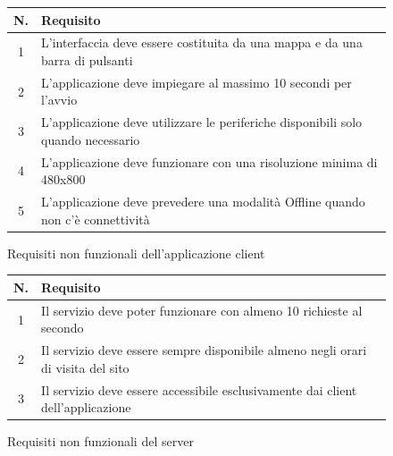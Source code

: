 \begin{figure}[h!]
\begin{center}
\begin{tabular}[c]{|c|p{9cm}|}
\hline
N. & Requisito\\ \hline
1 & L'interfaccia deve essere costituita da una mappa e da una barra di pulsanti\\ \hline
2 & L'applicazione deve impiegare al massimo 10 secondi per l'avvio\\ \hline
3 & L'applicazione deve utilizzare le periferiche disponibili solo quando necessario\\ \hline
4 & L'applicazione deve funzionare con una risoluzione minima di 480x800\\ \hline
5 & L'applicazione deve prevedere una modalità Offline quando non c'è connettività\\ \hline
\end{tabular}
\caption{Requisiti non funzionali dell'applicazione client\label{nfrclient}}
\end{center}
\end{figure}
\begin{figure}[h!]
\begin{center}
\begin{tabular}[c]{|c|p{9cm}|}
\hline
N. & Requisito\\ \hline
1 & Il servizio deve poter funzionare con almeno 10 richieste al secondo\\ \hline
2 & Il servizio deve essere sempre disponibile almeno negli orari di visita del sito\\ \hline
3 & Il servizio deve essere accessibile esclusivamente dai client dell'applicazione\\ \hline
\end{tabular}
\caption{Requisiti non funzionali del server\label{nfrserver}}
\end{center}
\end{figure}


